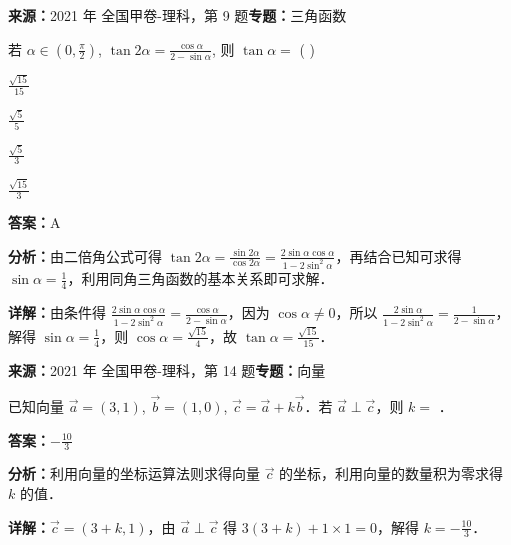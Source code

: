 \begin{question}[points=5]
\textbf{来源：}2021 年 全国甲卷-理科，第 9 题\quad \textbf{专题：}三角函数\par
若 $\alpha \in \left(0, \frac{\pi}{2}\right)$, $\tan 2\alpha = \frac{\cos \alpha}{2 - \sin \alpha}$, 则 $\tan \alpha = $ ( )
\begin{choices}
  \item $\frac{\sqrt{15}}{15}$
  \item $\frac{\sqrt{5}}{5}$
  \item $\frac{\sqrt{5}}{3}$
  \item $\frac{\sqrt{15}}{3}$
\end{choices}
\begin{solution}
\textbf{答案：}A

\textbf{分析：}由二倍角公式可得 $\tan 2\alpha = \frac{\sin 2\alpha}{\cos 2\alpha} = \frac{2\sin \alpha \cos \alpha}{1-2\sin^2 \alpha}$，再结合已知可求得 $\sin \alpha = \frac{1}{4}$，利用同角三角函数的基本关系即可求解．

\textbf{详解：}由条件得 $\frac{2\sin \alpha \cos \alpha}{1-2\sin^2 \alpha} = \frac{\cos \alpha}{2-\sin \alpha}$，因为 $\cos \alpha \neq 0$，所以 $\frac{2\sin \alpha}{1-2\sin^2 \alpha} = \frac{1}{2-\sin \alpha}$，解得 $\sin \alpha = \frac{1}{4}$，则 $\cos \alpha = \frac{\sqrt{15}}{4}$，故 $\tan \alpha = \frac{\sqrt{15}}{15}$．
\end{solution}
\end{question}

\begin{question}[points=5]
\textbf{来源：}2021 年 全国甲卷-理科，第 14 题\quad \textbf{专题：}向量\par
已知向量 $\vec{a} = (3,1)$, $\vec{b} = (1,0)$, $\vec{c} = \vec{a} + k\vec{b}$．若 $\vec{a} \perp \vec{c}$，则 $k = $ ．
\fillin[{$-\frac{10}{3}$}]
\begin{solution}
\textbf{答案：}$-\frac{10}{3}$

\textbf{分析：}利用向量的坐标运算法则求得向量 $\vec{c}$ 的坐标，利用向量的数量积为零求得 $k$ 的值．

\textbf{详解：}$\vec{c} = (3+k, 1)$，由 $\vec{a} \perp \vec{c}$ 得 $3(3+k) + 1\times 1 = 0$，解得 $k = -\frac{10}{3}$．
\end{solution}
\end{question}

